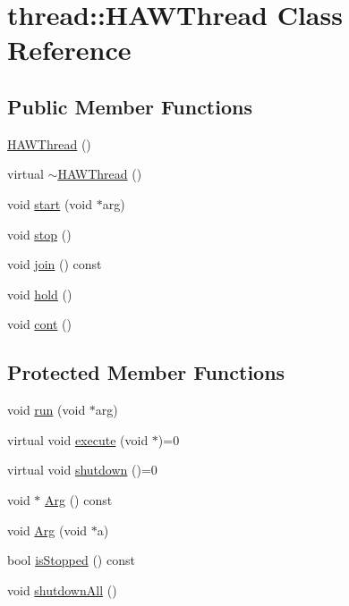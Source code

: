 \hypertarget{classthread_1_1HAWThread}{\section{thread\-:\-:H\-A\-W\-Thread Class Reference}
\label{classthread_1_1HAWThread}
}
\subsection*{Public Member Functions}
\begin{DoxyCompactItemize}
\item 
\hyperlink{classthread_1_1HAWThread_a7ae3280c8aee6ae6536c736a20d92e8d}{H\-A\-W\-Thread} ()
\item 
virtual \hyperlink{classthread_1_1HAWThread_a84706dda23aa384a43ced901381e795b}{$\sim$\-H\-A\-W\-Thread} ()
\item 
void \hyperlink{classthread_1_1HAWThread_ae08d268c337511a1e67fbbeefcb1e89d}{start} (void $\ast$arg)
\item 
void \hyperlink{classthread_1_1HAWThread_ae8a89c83fd7e9b9a712c19f636ab2638}{stop} ()
\item 
void \hyperlink{classthread_1_1HAWThread_a4732efa3445c499f1723971acc07863f}{join} () const 
\item 
void \hyperlink{classthread_1_1HAWThread_a18f2a0cc61833e98b18e56ea541fa38b}{hold} ()
\item 
void \hyperlink{classthread_1_1HAWThread_a4c480261e3236c90c8de73be55650ba4}{cont} ()
\end{DoxyCompactItemize}
\subsection*{Protected Member Functions}
\begin{DoxyCompactItemize}
\item 
void \hyperlink{classthread_1_1HAWThread_a9a3e17be59877d350e310eb19c52679b}{run} (void $\ast$arg)
\item 
virtual void \hyperlink{classthread_1_1HAWThread_ae565cb73c096b246664bd2474b9c8907}{execute} (void $\ast$)=0
\item 
virtual void \hyperlink{classthread_1_1HAWThread_a843ee9493a41cec7e932fdec67a3b244}{shutdown} ()=0
\item 
void $\ast$ \hyperlink{classthread_1_1HAWThread_ab692f3a55b92623653d8213793ba4ebb}{Arg} () const 
\item 
void \hyperlink{classthread_1_1HAWThread_a368c07a801fb8f5e7bb181d2453df4be}{Arg} (void $\ast$a)
\item 
bool \hyperlink{classthread_1_1HAWThread_a46e9f127856f36917b3a8a345b7be5ee}{is\-Stopped} () const 
\item 
void \hyperlink{classthread_1_1HAWThread_a5124385e940aa8d52510a4be10af173c}{shutdown\-All} ()
\end{DoxyCompactItemize}
